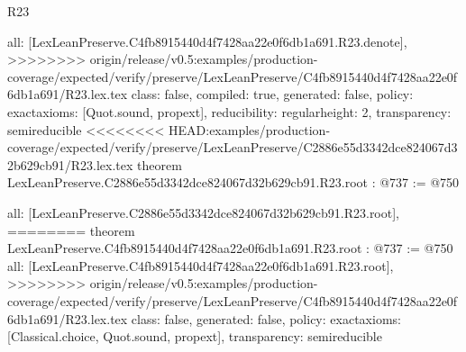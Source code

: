 \begin{lexlean}{R23}
\begin{coremodule}
{{{{{  all: [LexLeanPreserve.C4fb8915440d4f7428aa22e0f6db1a691.R23.denote],
>>>>>>>> origin/release/v0.5:examples/production-coverage/expected/verify/preserve/LexLeanPreserve/C4fb8915440d4f7428aa22e0f6db1a691/R23.lex.tex
  class: false,
  compiled: true,
  generated: false,
  policy: exact{axioms: [Quot.sound, propext]},
  reducibility: regular{height: 2},
  transparency: semireducible
}
<<<<<<<< HEAD:examples/production-coverage/expected/verify/preserve/LexLeanPreserve/C2886e55d3342dce824067d32b629cb91/R23.lex.tex
theorem LexLeanPreserve.C2886e55d3342dce824067d32b629cb91.R23.root : @737 := @750 {
  all: [LexLeanPreserve.C2886e55d3342dce824067d32b629cb91.R23.root],
========
theorem LexLeanPreserve.C4fb8915440d4f7428aa22e0f6db1a691.R23.root : @737 := @750 {
  all: [LexLeanPreserve.C4fb8915440d4f7428aa22e0f6db1a691.R23.root],
>>>>>>>> origin/release/v0.5:examples/production-coverage/expected/verify/preserve/LexLeanPreserve/C4fb8915440d4f7428aa22e0f6db1a691/R23.lex.tex
  class: false,
  generated: false,
  policy: exact{axioms: [Classical.choice, Quot.sound, propext]},
  transparency: semireducible
}

}}}}}
\end{coremodule}
\end{lexlean}
